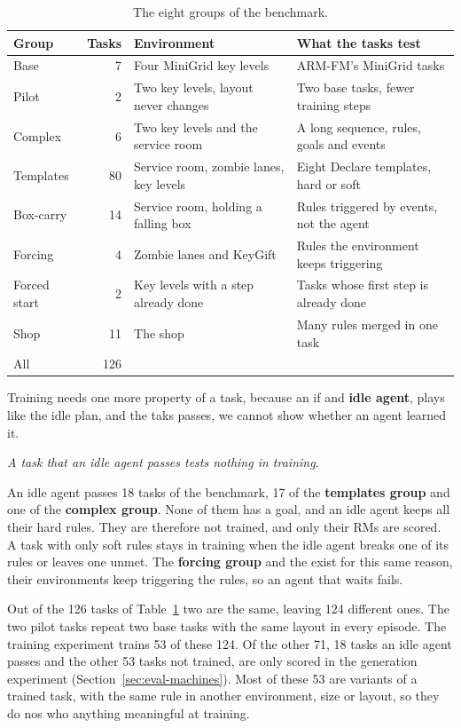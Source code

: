\documentclass[11pt,english,listoffigures,listoftables]{tfgetsinf}
\newcommand{\keyidea}[1]{\par\smallskip\noindent\hspace*{0.6em}{\color{gray!55}\vrule width 1.5pt}\hspace{8pt}\parbox[t]{\dimexpr\linewidth-0.6em-9.5pt\relax}{\itshape #1}\par\smallskip}  %
\begin{document}
\begin{table}[H]
\centering
\footnotesize
\renewcommand{\arraystretch}{1.2}
\begin{tabularx}{\textwidth}{@{}lr>{\raggedright\arraybackslash}X>{\raggedright\arraybackslash}X@{}}
\toprule
\textbf{Group} & \textbf{Tasks} & \textbf{Environment} & \textbf{What the tasks test} \\ \midrule
Base & 7 & Four MiniGrid key levels & ARM-FM's MiniGrid tasks \\
Pilot & 2 & Two key levels, layout never changes & Two base tasks, fewer training steps \\
Complex & 6 & Two key levels and the service room & A long sequence, rules, goals and events \\
Templates & 80 & Service room, zombie lanes, key levels & Eight Declare templates, hard or soft \\
Box-carry & 14 & Service room, holding a falling box & Rules triggered by events, not the agent \\
Forcing & 4 & Zombie lanes and KeyGift & Rules the environment keeps triggering \\
Forced start & 2 & Key levels with a step already done & Tasks whose first step is already done \\
Shop & 11 & The shop & Many rules merged in one task \\ \midrule
All & 126 & & \\ \bottomrule
\end{tabularx}
\caption{The eight groups of the benchmark.}
\label{tab:eval-suites}
\end{table}

Training needs one more property of a task, because an if and \textbf{idle agent}, plays like the idle plan, and the taks passes, we cannot show whether an agent learned it. 

\keyidea{A task that an idle agent passes tests nothing in training.}

An idle agent passes 18 tasks of the benchmark, 17 of the \textbf{templates group} and one of the \textbf{complex group}. None of them has a goal, and an idle agent keeps all their hard rules. They are therefore not trained, and only their RMs are scored. A task with only soft rules stays in training when the idle agent breaks one of its rules or leaves one unmet. The \textbf{forcing group} and the  exist for this same reason, their environments keep triggering the rules, so an agent that waits fails.

Out of the 126 tasks of Table~\ref{tab:eval-suites} two are the same, leaving 124 different ones. The two pilot tasks repeat two base tasks with the same layout in every episode. The training experiment trains 53 of these 124. Of the other 71, 18 tasks an idle agent passes and the other 53 tasks not trained, are only scored in the generation experiment (Section~\ref{sec:eval-machines}). Most of these 53 are variants of a trained task, with the same rule in another environment, size or layout, so they do nos who anything meaningful at training.
\end{document}
